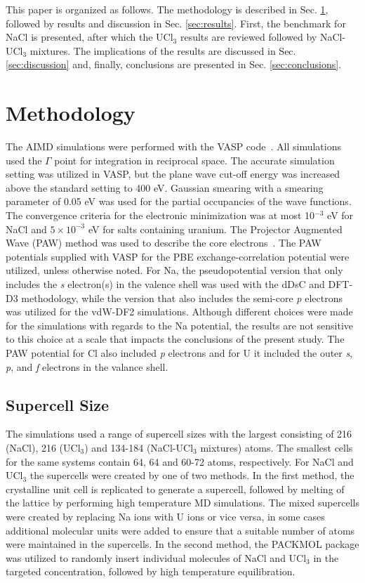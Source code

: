 \documentclass[preprint,3p,10pt,onecolumn,number,sort&compress]{elsarticle}
\begin{document}
This paper is organized as follows. The methodology is described in Sec. \ref{sec:method}, followed by results and discussion in Sec. \ref{sec:results}. First, the benchmark for NaCl is presented, after which the UCl$_3$ results are reviewed followed by NaCl-UCl$_3$ mixtures. The implications of the results are discussed in Sec. \ref{sec:discussion} and, finally, conclusions are presented in Sec. \ref{sec:conclusions}. 

\section{Methodology}
\label{sec:method}
The AIMD simulations were performed with the VASP code~\cite{Kresse1996}. All simulations used the $\Gamma$ point for integration in reciprocal space. The accurate simulation setting was utilized in VASP, but the plane wave cut-off energy was increased above the standard setting to 400 eV. Gaussian smearing with a smearing parameter of 0.05 eV was used for the partial occupancies of the wave functions. The convergence criteria for the electronic minimization was at most 10$^{-3}$ eV for NaCl and $5\times10^{-3}$ eV for salts containing uranium. The Projector Augmented Wave (PAW) method was used to describe the core electrons~\cite{PAW1,PAW2}. The PAW potentials supplied with VASP for the PBE exchange-correlation potential were utilized, unless otherwise noted. For Na, the pseudopotential version that only includes the \textit{s} electron(s) in the valence shell was used with the dDsC and DFT-D3 methodology, while the version that also includes the semi-core \textit{p} electrons was utilized for the vdW-DF2 simulations. Although different choices were made for the simulations with regards to the Na potential, the results are not sensitive to this choice at a scale that impacts the conclusions of the present study. The PAW potential for Cl also included \textit{p} electrons and for U it included the outer \textit{s}, \textit{p}, and \textit{f} electrons in the valance shell. 

\subsection{Supercell Size}
The simulations used a range of supercell sizes with the largest consisting of 216 (NaCl), 216 (UCl$_3$) and 134-184 (NaCl-UCl$_3$ mixtures) atoms. The smallest cells for the same systems contain 64, 64 and 60-72 atoms, respectively. %
For NaCl and UCl$_3$ the supercells were created by one of two methods. In the first method, the crystalline unit cell is replicated to generate a supercell, followed by melting of the lattice by performing high temperature MD simulations. The mixed supercells were created by replacing Na ions with U ions or vice versa, in some cases additional molecular units were added to ensure that a suitable number of atoms were maintained in the supercells. In the second method, the PACKMOL package \cite{packmol} was utilized to randomly insert individual molecules of NaCl and UCl$_3$ in the targeted concentration, followed by high temperature equilibration. 
\end{document}
